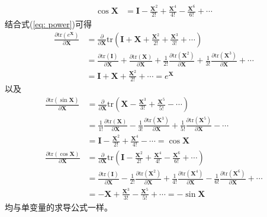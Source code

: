 \documentclass{ctexart}
\theoremstyle{definition}
\def \Iv {\mathbf{I}}
\def \Xv {\mathbf{X}}
\def \tr {\mathrm{tr}}
\begin{document}
\begin{itemize}
\begin{align*}
              \cos \Xv & = \Iv - \frac{\Xv^2}{2!} + \frac{\Xv^4}{4!} - \frac{\Xv^6}{6!} + \cdots
          \end{align*}
          结合式(\ref{eq: power})可得
          \begin{align*}
              \frac{\partial \tr(e^{\Xv})}{\partial \Xv} & = \frac{\partial }{\partial \Xv} \tr \left( \Iv + \Xv + \frac{\Xv^2}{2!} + \frac{\Xv^3}{3!} + \cdots \right)                                                                                                   \\
                                                         & = \frac{\partial \tr (\Iv)}{\partial \Xv} + \frac{\partial \tr (\Xv)}{\partial \Xv} + \frac{1}{2!} \frac{\partial \tr (\Xv^2)}{\partial \Xv} + \frac{1}{3!} \frac{\partial \tr (\Xv^3)}{\partial \Xv} + \cdots \\
                                                         & = \Iv + \Xv + \frac{\Xv^2}{2!} + \cdots = e^{\Xv}
          \end{align*}
          以及
          \begin{align*}
              \frac{\partial \tr(\sin \Xv)}{\partial \Xv} & = \frac{\partial }{\partial \Xv} \tr \left( \Xv - \frac{\Xv^3}{3!} + \frac{\Xv^5}{5!} - \cdots \right)                                                                                                                        \\
                                                          & = \frac{1}{1!} \frac{\partial \tr (\Xv)}{\partial \Xv} - \frac{1}{3!} \frac{\partial \tr (\Xv^3)}{\partial \Xv} + \frac{1}{5!} \frac{\partial \tr (\Xv^5)}{\partial \Xv} - \cdots                                             \\
                                                          & = \Iv - \frac{\Xv^2}{2!} + \frac{\Xv^4}{4!} - \cdots = \cos \Xv                                                                                                                                                               \\
              \frac{\partial \tr(\cos \Xv)}{\partial \Xv} & = \frac{\partial }{\partial \Xv} \tr \left( \Iv - \frac{\Xv^2}{2!} + \frac{\Xv^4}{4!} - \frac{\Xv^6}{6!} + \cdots \right)                                                                                                     \\
                                                          & = \frac{\partial \tr (\Iv)}{\partial \Xv} - \frac{1}{2!} \frac{\partial \tr (\Xv^2)}{\partial \Xv} + \frac{1}{4!} \frac{\partial \tr (\Xv^4)}{\partial \Xv} - \frac{1}{6!} \frac{\partial \tr (\Xv^6)}{\partial \Xv} + \cdots \\
                                                          & = - \Xv + \frac{\Xv^3}{3!} - \frac{\Xv^5}{5!} + \cdots = - \sin \Xv
          \end{align*}
          均与单变量的求导公式一样。


\end{itemize}
\end{document}
